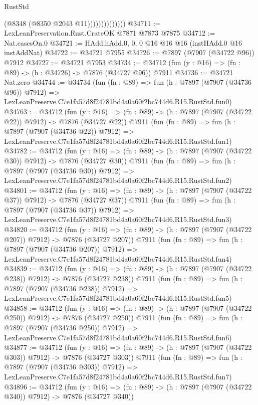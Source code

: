 \begin{lexlean}{RustStd}
\begin{coremodule}
                            (@8348 (@8350 @2043 @11))))))))))))))
@34711 := LexLeanPreservation.Rust.CrateOK @7871 @7873 @7875
@34712 := Nat.casesOn.{0}
@34721 := HAdd.hAdd.{0, 0, 0} @16 @16 @16 (instHAdd.{0} @16 instAddNat)
@34722 := @34721 @7955
@34726 := @7897 (@7907 (@34722 @96)) @7912
@34727 := @34721 @7953
@34734 := @34712 (fun (y : @16) => (fn : @89) -> (h : @34726) -> @7876 (@34727 @96)) @7911
@34736 := @34721 Nat.zero
@34744 := @34734
    (fun (fn : @89) =>
    fun (h : @7897 (@7907 (@34736 @96)) @7912) =>
    LexLeanPreserve.C7e1fa57d8f24781bd4a0a60f2bc744d6.R15.RustStd.fun0)
@34763 := @34712
    (fun (y : @16) => (fn : @89) -> (h : @7897 (@7907 (@34722 @22)) @7912) -> @7876 (@34727 @22))
    @7911
    (fun (fn : @89) =>
    fun (h : @7897 (@7907 (@34736 @22)) @7912) =>
    LexLeanPreserve.C7e1fa57d8f24781bd4a0a60f2bc744d6.R15.RustStd.fun1)
@34782 := @34712
    (fun (y : @16) => (fn : @89) -> (h : @7897 (@7907 (@34722 @30)) @7912) -> @7876 (@34727 @30))
    @7911
    (fun (fn : @89) =>
    fun (h : @7897 (@7907 (@34736 @30)) @7912) =>
    LexLeanPreserve.C7e1fa57d8f24781bd4a0a60f2bc744d6.R15.RustStd.fun2)
@34801 := @34712
    (fun (y : @16) => (fn : @89) -> (h : @7897 (@7907 (@34722 @37)) @7912) -> @7876 (@34727 @37))
    @7911
    (fun (fn : @89) =>
    fun (h : @7897 (@7907 (@34736 @37)) @7912) =>
    LexLeanPreserve.C7e1fa57d8f24781bd4a0a60f2bc744d6.R15.RustStd.fun3)
@34820 := @34712
    (fun (y : @16) => (fn : @89) -> (h : @7897 (@7907 (@34722 @207)) @7912) -> @7876 (@34727 @207))
    @7911
    (fun (fn : @89) =>
    fun (h : @7897 (@7907 (@34736 @207)) @7912) =>
    LexLeanPreserve.C7e1fa57d8f24781bd4a0a60f2bc744d6.R15.RustStd.fun4)
@34839 := @34712
    (fun (y : @16) => (fn : @89) -> (h : @7897 (@7907 (@34722 @238)) @7912) -> @7876 (@34727 @238))
    @7911
    (fun (fn : @89) =>
    fun (h : @7897 (@7907 (@34736 @238)) @7912) =>
    LexLeanPreserve.C7e1fa57d8f24781bd4a0a60f2bc744d6.R15.RustStd.fun5)
@34858 := @34712
    (fun (y : @16) => (fn : @89) -> (h : @7897 (@7907 (@34722 @250)) @7912) -> @7876 (@34727 @250))
    @7911
    (fun (fn : @89) =>
    fun (h : @7897 (@7907 (@34736 @250)) @7912) =>
    LexLeanPreserve.C7e1fa57d8f24781bd4a0a60f2bc744d6.R15.RustStd.fun6)
@34877 := @34712
    (fun (y : @16) => (fn : @89) -> (h : @7897 (@7907 (@34722 @303)) @7912) -> @7876 (@34727 @303))
    @7911
    (fun (fn : @89) =>
    fun (h : @7897 (@7907 (@34736 @303)) @7912) =>
    LexLeanPreserve.C7e1fa57d8f24781bd4a0a60f2bc744d6.R15.RustStd.fun7)
@34896 := @34712
    (fun (y : @16) => (fn : @89) -> (h : @7897 (@7907 (@34722 @340)) @7912) -> @7876 (@34727 @340))

\end{coremodule}
\end{lexlean}
